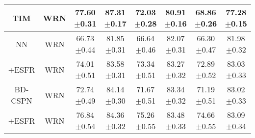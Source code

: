 \documentclass{article}
\begin{document}
\begin{table}[t]
\begin{small}
\begin{center}
\begin{tabular}{cccccccc}
				TIM & WRN & 77.60$\pm$0.31 & 87.31$\pm$0.17 & 72.03$\pm$0.28 & 80.91$\pm$0.16 & 68.86$\pm$0.26 & 77.28$\pm$0.15 \\ \hline
				NN & WRN & 66.73$\pm$0.44 & 81.85$\pm$0.31 & 66.64$\pm$0.46 & 82.07$\pm$0.31 & 66.30$\pm$0.47 & 81.98$\pm$0.32 \\
				\rowcolor[HTML]{EFEFEF}+ESFR & WRN & 74.01$\pm$0.51 & 83.58$\pm$0.31 & 73.34$\pm$0.51 & 83.27$\pm$0.32 & 72.89$\pm$0.52 & 83.03$\pm$0.33 \\ \hline
				BD-CSPN & WRN & 72.74$\pm$0.49 & 84.14$\pm$0.30 & 71.67$\pm$0.51 & 83.34$\pm$0.32 & 71.19$\pm$0.51 & 83.02$\pm$0.33 \\
				\rowcolor[HTML]{EFEFEF}+ESFR & WRN & 76.84$\pm$0.54 & 84.36$\pm$0.32 & 75.26$\pm$0.55 & 83.48$\pm$0.33 & 74.66$\pm$0.55 & 83.09$\pm$0.34 \\ \hline
				

\end{tabular}
\end{center}
\end{small}
\end{table}
\end{document}
